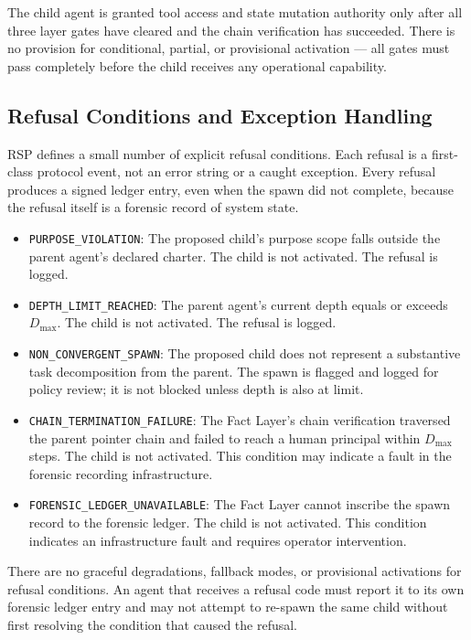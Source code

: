 The child agent is granted tool access and state mutation authority only after all three layer gates have cleared and the chain verification has succeeded. There is no provision for conditional, partial, or provisional activation — all gates must pass completely before the child receives any operational capability.

\subsection{Refusal Conditions and Exception Handling}

RSP defines a small number of explicit refusal conditions. Each refusal is a first-class protocol event, not an error string or a caught exception. Every refusal produces a signed ledger entry, even when the spawn did not complete, because the refusal itself is a forensic record of system state.

\begin{itemize}
    \item \texttt{PURPOSE\_VIOLATION}: The proposed child's purpose scope falls outside the parent agent's declared charter. The child is not activated. The refusal is logged.
    \item \texttt{DEPTH\_LIMIT\_REACHED}: The parent agent's current depth equals or exceeds $D_{\max}$. The child is not activated. The refusal is logged.
    \item \texttt{NON\_CONVERGENT\_SPAWN}: The proposed child does not represent a substantive task decomposition from the parent. The spawn is flagged and logged for policy review; it is not blocked unless depth is also at limit.
    \item \texttt{CHAIN\_TERMINATION\_FAILURE}: The Fact Layer's chain verification traversed the parent pointer chain and failed to reach a human principal within $D_{\max}$ steps. The child is not activated. This condition may indicate a fault in the forensic recording infrastructure.
    \item \texttt{FORENSIC\_LEDGER\_UNAVAILABLE}: The Fact Layer cannot inscribe the spawn record to the forensic ledger. The child is not activated. This condition indicates an infrastructure fault and requires operator intervention.
\end{itemize}

There are no graceful degradations, fallback modes, or provisional activations for refusal conditions. An agent that receives a refusal code must report it to its own forensic ledger entry and may not attempt to re-spawn the same child without first resolving the condition that caused the refusal.

